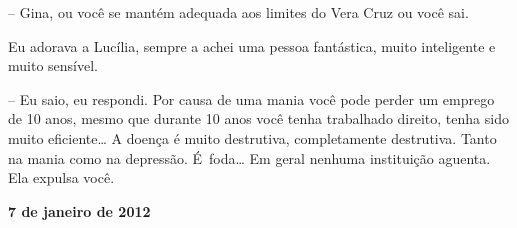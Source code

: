-- Gina, ou você se mantém adequada aos limites do Vera Cruz ou você
sai.

Eu adorava a Lucília, sempre a achei uma pessoa fantástica, muito
inteligente e muito sensível.

-- Eu saio, eu respondi. Por causa de uma mania você pode perder um
emprego de 10 anos, mesmo que durante 10 anos você tenha trabalhado
direito, tenha sido muito eficiente… A doença é muito destrutiva,
completamente destrutiva. Tanto na mania como na depressão. É~foda… 
Em geral nenhuma instituição aguenta. Ela expulsa você.

\begin{center}\asterisc{}\textbf{}\end{center}

\begin{flushright}\textbf{7 de janeiro de 2012}\end{flushright}


